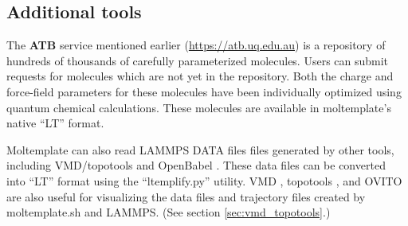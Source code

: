 \documentclass[11pt]{article}
\begin{document}
%


\subsection*{Additional tools}
The \textbf{ATB} service \cite{ATB}
mentioned earlier (\url{https://atb.uq.edu.au})
is a repository of hundreds of thousands of carefully parameterized molecules.
Users can submit requests for molecules which are not yet in the repository.
Both the charge and force-field parameters for these molecules
have been individually optimized using quantum chemical calculations.
These molecules are available in moltemplate's native ``LT'' format.

Moltemplate can also read LAMMPS DATA files files generated by other tools,
including VMD/topotools \cite{topotools}
and OpenBabel \cite{OpenBABEL}.
These data files can be converted
into ``LT'' format using the ``ltemplify.py'' utility.
VMD \cite{VMD}, topotools \cite{topotools}, and OVITO \cite{OVITO}
are also useful for visualizing the data files and trajectory files
created by moltemplate.sh and LAMMPS.
(See section \ref{sec:vmd_topotools}.)
\end{document}
